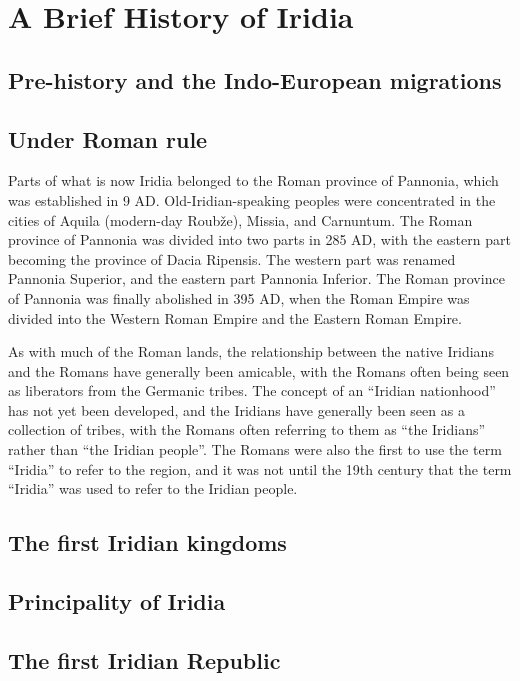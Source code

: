 \chapter{A Brief History of Iridia}

\section{Pre-history and the Indo-European migrations}

\section{Under Roman rule}

Parts of what is now Iridia belonged to the Roman province of Pannonia, which was established in 9 AD. Old-Iridian-speaking peoples were concentrated in the cities of Aquila (modern-day Roubže), Missia, and Carnuntum. The Roman province of Pannonia was divided into two parts in 285 AD, with the eastern part becoming the province of Dacia Ripensis. The western part was renamed Pannonia Superior, and the eastern part Pannonia Inferior. The Roman province of Pannonia was finally abolished in 395 AD, when the Roman Empire was divided into the Western Roman Empire and the Eastern Roman Empire.

As with much of the Roman lands, the relationship between the native Iridians and the Romans have generally been amicable, with the Romans often being seen as liberators from the Germanic tribes. The concept of an ``Iridian nationhood'' has not yet been developed, and the Iridians have generally been seen as a collection of tribes, with the Romans often referring to them as ``the Iridians'' rather than ``the Iridian people''. The Romans were also the first to use the term ``Iridia'' to refer to the region, and it was not until the 19th century that the term ``Iridia'' was used to refer to the Iridian people.



\section{The first Iridian kingdoms}


\section{Principality of Iridia}


\section{The first Iridian Republic}

